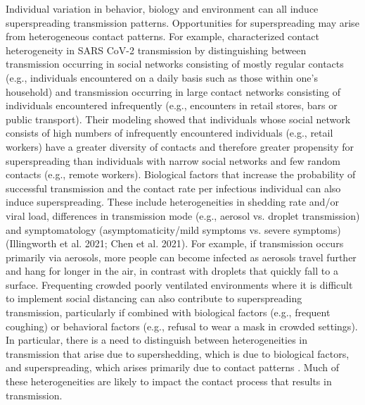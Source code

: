 \documentclass{imammb}
\numberwithin{equation}{section}
\begin{document}
Individual variation in behavior, biology and environment can all induce superspreading transmission patterns. Opportunities for superspreading may arise from heterogeneous contact patterns. For example, \citet{Sneppen2021-mr} characterized contact heterogeneity in SARS CoV-2 transmission by distinguishing between transmission occurring in social networks consisting of mostly regular contacts (e.g., individuals encountered on a daily basis such as those within one’s household) and transmission occurring in large contact networks consisting of individuals encountered infrequently (e.g., encounters in retail stores, bars or public transport). Their modeling showed that individuals whose social network consists of high numbers of infrequently encountered individuals (e.g., retail workers) have a greater diversity of contacts and therefore greater propensity for superspreading than individuals with narrow social networks and few random contacts (e.g., remote workers). Biological factors that increase the probability of successful transmission and the contact rate per infectious individual can also induce superspreading. These include heterogeneities in shedding rate and/or viral load, differences in transmission mode (e.g., aerosol vs. droplet transmission) and symptomatology (asymptomaticity/mild symptoms vs. severe symptoms) \citep{Chen2021-nx, Chen2021-wo}(Illingworth et al. 2021; Chen et al. 2021). For example, if transmission occurs primarily via aerosols, more people can become infected as aerosols travel further and hang for longer in the air, in contrast with droplets that quickly fall to a surface. Frequenting crowded poorly ventilated environments where it is difficult to implement social distancing can also contribute to superspreading transmission, particularly if combined with biological factors (e.g., frequent coughing) or behavioral factors (e.g., refusal to wear a mask in crowded settings). In particular, there is a need to distinguish between heterogeneities in transmission that arise due to supershedding, which is due to biological factors, and superspreading, which arises primarily due to contact patterns \citep{Rock2014-nc}. Much of these heterogeneities are likely to impact the contact process that results in transmission.

\end{document}
